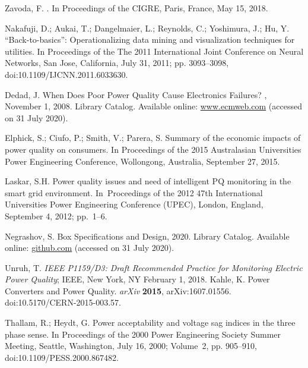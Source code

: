 \documentclass[energies,article,accept,moreauthors,pdftex]{Definitions/mdpi}
\begin{document}
\begin{thebibliography}{999}
Zavoda, F.
. In {Proceedings of the } CIGRE, Paris, France, May 15, 2018.

Nakafuji, D.; Aukai, T.; Dangelmaier, L.; Reynolds, C.; Yoshimura, J.; {
Hu, Y}.
\newblock “{Back}-to-basics”: {Operationalizing} data mining and visualization
techniques for utilities.
\newblock In {Proceedings of the }The 2011 International Joint Conference on Neural Networks, San Jose, California, July 31, 2011; pp. 3093--3098, doi:10.1109/IJCNN.2011.6033630.

Dedad, J.
\newblock When {Does} {Poor} {Power} {Quality} {Cause} {Electronics}
{Failures}?
, {November 1, 2008}.
\newblock Library Catalog.  Available online:  \url{www.ecmweb.com} (accessed on 31 July 2020).

Elphick, S.; Ciufo, P.; Smith, V.; Parera, S.
\newblock Summary of the economic impacts of power quality on consumers.
\newblock  In {Proceedings of the }2015 {Australasian} {Universities} {Power} {Engineering}
{Conference}, Wollongong, Australia, September 27, 2015.

Laskar, S.H.
\newblock Power quality issues and need of intelligent {PQ} monitoring in the
smart grid environment.
\newblock In~{Proceedings of the }2012 47th
{International} Universities {Power} {Engineering} {Conference} ({UPEC}), London, England, September 4, 2012; pp.~1--6.

Negrashov, S.
 {Box} {Specifications} and {Design}, 2020.
\newblock Library Catalog.  Available online:  \url{github.com} (accessed on 31 July 2020).

Unruh, T.
\newblock \emph{IEEE P1159/D3: {Draft} {Recommended} {Practice} for
{Monitoring} {Electric} {Power} {Quality}}; IEEE, New York, NY February 1, 2018.
Kahle, K.
\newblock Power {Converters} and {Power} {Quality}.
\newblock \emph{arXiv} \textbf{2015}, arXiv:1607.01556. doi:10.5170/CERN-2015-003.57.


Thallam, R.; Heydt, G.
\newblock Power acceptability and voltage sag indices in the three phase sense.
\newblock In {Proceedings of the } 2000 {Power} {Engineering} {Society} {Summer} {Meeting}, Seattle, Washington,
 July 16, 2000; Volume~2, pp. 905--910, doi:10.1109/PESS.2000.867482.


\end{thebibliography}
\end{document}
